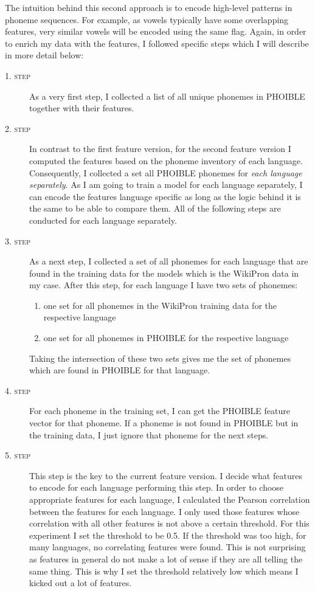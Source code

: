 The intuition behind this second approach is to encode high-level patterns in phoneme sequences. For example, as vowels typically have some overlapping features, very similar vowels will be encoded using the same flag. Again, in order to enrich my data with the features, I followed specific steps which I will describe in more detail below: 

\begin{description}
    \item[\textsc{1. step}] As a very first step, I collected a list of all unique phonemes in PHOIBLE together with their features.
    \item[\textsc{2. step}] In contrast to the first feature version, for the second feature version I computed the features based on the phoneme inventory of each language. Consequently, I collected a set all PHOIBLE phonemes for \textit{each language separately}. As I am going to train a model for each language separately, I can encode the features language specific as long as the logic behind it is the same to be able to compare them. All of the following steps are conducted for each language separately.
    \item[\textsc{3. step}] As a next step, I collected a set of all phonemes for each language that are found in the training data for the models which is the WikiPron data in my case. 
    After this step, for each language I have two sets of phonemes:
    \begin{enumerate}
        \item one set for all phonemes in the WikiPron training data for the respective language
        \item one set for all phonemes in PHOIBLE for the respective language
    \end{enumerate}
    Taking the intersection of these two sets gives me the set of phonemes which are found in PHOIBLE for that language.
    \item[\textsc{4. step}] For each phoneme in the training set, I can get the PHOIBLE feature vector for that phoneme. If a phoneme is not found in PHOIBLE but in the training data, I just ignore that phoneme for the next steps.
    \item[\textsc{5. step}] This step is the key to the current feature version. I decide what features to encode for each language performing this step. In order to choose appropriate features for each language, I calculated the Pearson correlation between the features for each language. I only used those features whose correlation with all other features is not above a certain threshold. For this experiment I set the threshold to be 0.5. If the threshold was too high, for many languages, no correlating features were found. This is not surprising as features in general do not make a lot of sense if they are all telling the same thing. This is why I set the threshold relatively low which means I kicked out a lot of features. 
    

\end{description}
